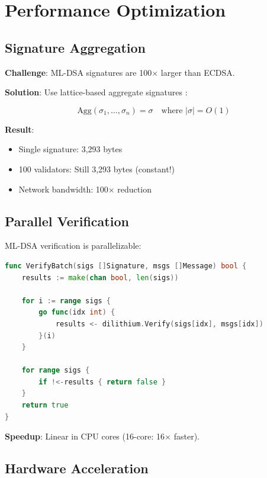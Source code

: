 \section{Performance Optimization}


\subsection{Signature Aggregation}

\textbf{Challenge}: ML-DSA signatures are 100$\times$ larger than ECDSA.

\textbf{Solution}: Use lattice-based aggregate signatures \cite{boneh2003aggregate}:

\begin{equation}
\text{Agg}(\sigma_1, \ldots, \sigma_n) = \sigma \quad \text{where } |\sigma| = O(1)
\end{equation}

\textbf{Result}: 
\begin{itemize}
    \item Single signature: 3,293 bytes
    \item 100 validators: Still 3,293 bytes (constant!)
    \item Network bandwidth: 100$\times$ reduction
\end{itemize}

\subsection{Parallel Verification}

ML-DSA verification is parallelizable:

\begin{lstlisting}[language=Go]
func VerifyBatch(sigs []Signature, msgs []Message) bool {
    results := make(chan bool, len(sigs))
    
    for i := range sigs {
        go func(idx int) {
            results <- dilithium.Verify(sigs[idx], msgs[idx])
        }(i)
    }
    
    for range sigs {
        if !<-results { return false }
    }
    return true
}
\end{lstlisting}

\textbf{Speedup}: Linear in CPU cores (16-core: 16$\times$ faster).

\subsection{Hardware Acceleration}

